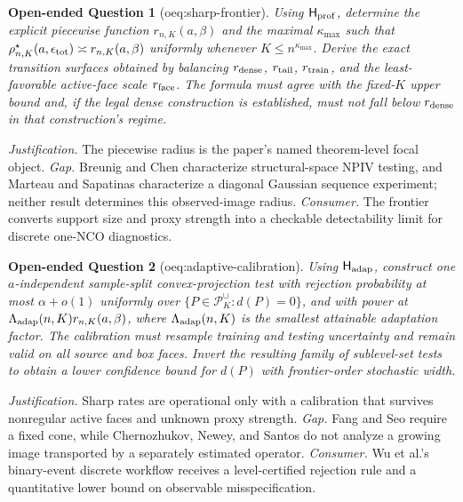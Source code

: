 \documentclass{article}
\newtheorem{openendedquestion}{Open-ended Question}
\begin{document}
\begin{openendedquestion}[oeq:sharp-frontier]\label{oeq:sharp-frontier}
Using \(\mathsf H_{\rm prof}\), determine the explicit piecewise function \(r_{n,K}(a,\beta)\) and the maximal \(\kappa_{\max}\) such that \(\rho^\star_{n,K}(a,\epsilon_{\rm tot})\asymp r_{n,K}(a,\beta)\) uniformly whenever \(K\le n^{\kappa_{\max}}\). Derive the exact transition surfaces obtained by balancing \(r_{\rm dense}\), \(r_{\rm tail}\), \(r_{\rm train}\), and the least-favorable active-face scale \(r_{\rm face}\). The formula must agree with the fixed-\(K\) upper bound and, if the legal dense construction is established, must not fall below \(r_{\rm dense}\) in that construction's regime.
\end{openendedquestion}
\par\smallskip\noindent \textit{Justification.} The piecewise radius is the paper's named theorem-level focal object. \textit{Gap.} Breunig and Chen characterize structural-space NPIV testing, and Marteau and Sapatinas characterize a diagonal Gaussian sequence experiment; neither result determines this observed-image radius. \textit{Consumer.} The frontier converts support size and proxy strength into a checkable detectability limit for discrete one-NCO diagnostics.

\begin{openendedquestion}[oeq:adaptive-calibration]\label{oeq:adaptive-calibration}
Using \(\mathsf H_{\rm adap}\), construct one \(a\)-independent sample-split convex-projection test with rejection probability at most \(\alpha+o(1)\) uniformly over \(\{P\in\mathcal P_K^{\cup}:d(P)=0\}\), and with power at \(\Lambda_{\rm adap}(n,K)r_{n,K}(a,\beta)\), where \(\Lambda_{\rm adap}(n,K)\) is the smallest attainable adaptation factor. The calibration must resample training and testing uncertainty and remain valid on all source and box faces. Invert the resulting family of sublevel-set tests to obtain a lower confidence bound for \(d(P)\) with frontier-order stochastic width.
\end{openendedquestion}
\par\smallskip\noindent \textit{Justification.} Sharp rates are operational only with a calibration that survives nonregular active faces and unknown proxy strength. \textit{Gap.} Fang and Seo require a fixed cone, while Chernozhukov, Newey, and Santos do not analyze a growing image transported by a separately estimated operator. \textit{Consumer.} Wu et al.'s binary-event discrete workflow receives a level-certified rejection rule and a quantitative lower bound on observable misspecification.
\end{document}
